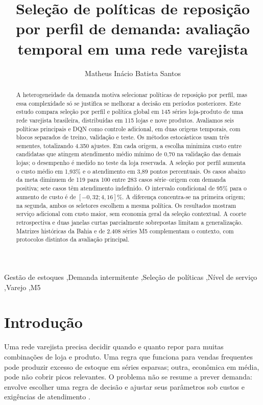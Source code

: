 \documentclass[preprint,12pt]{elsarticle}
\begin{document}
\begin{frontmatter}
\title{Seleção de políticas de reposição por perfil de demanda: avaliação temporal em uma rede varejista}
\author[ufal]{Matheus Inácio Batista Santos}
\begin{abstract}
A heterogeneidade da demanda motiva selecionar políticas de reposição por perfil, mas essa complexidade só se justifica se melhorar a decisão em períodos posteriores. Este estudo compara seleção por perfil e política global em 145 séries loja-produto de uma rede varejista brasileira, distribuídas em 115 lojas e nove produtos. Avaliamos seis políticas principais e DQN como controle adicional, em duas origens temporais, com blocos separados de treino, validação e teste. Os métodos estocásticos usam três sementes, totalizando 4.350 ajustes. Em cada origem, a escolha minimiza custo entre candidatas que atingem atendimento médio mínimo de 0,70 na validação das demais lojas; o desempenho é medido no teste da loja reservada. A seleção por perfil aumenta o custo médio em 1,93\% e o atendimento em 3,89 pontos percentuais. Os casos abaixo da meta diminuem de 119 para 100 entre 283 casos série--origem com demanda positiva; sete casos têm atendimento indefinido. O intervalo condicional de 95\% para o aumento de custo é de $[-0{,}32;4{,}16]\%$. A diferença concentra-se na primeira origem; na segunda, ambos os seletores escolhem a mesma política. Os resultados mostram serviço adicional com custo maior, sem economia geral da seleção contextual. A coorte retrospectiva e duas janelas curtas parcialmente sobrepostas limitam a generalização. Matrizes históricas da Bahia e de 2.408 séries M5 complementam o contexto, com protocolos distintos da avaliação principal.
\end{abstract}
\begin{keyword}
Gestão de estoques \sep Demanda intermitente \sep Seleção de políticas \sep Nível de serviço \sep Varejo \sep M5
\end{keyword}
\end{frontmatter}

\section{Introdução}
Uma rede varejista precisa decidir quando e quanto repor para muitas combinações de loja e produto. Uma regra que funciona para vendas frequentes pode produzir excesso de estoque em séries esparsas; outra, econômica em média, pode não cobrir picos relevantes. O problema não se resume a prever demanda: envolve escolher uma regra de decisão e ajustar seus parâmetros sob custos e exigências de atendimento \cite{Axsater2006InventoryControl}.
\end{document}
